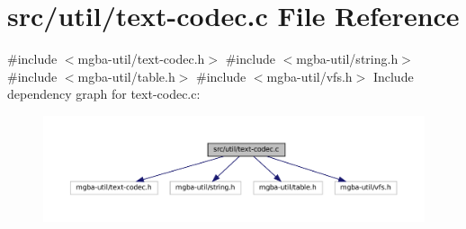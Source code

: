 \hypertarget{text-codec_8c}{}\section{src/util/text-\/codec.c File Reference}
\label{text-codec_8c}
{\ttfamily \#include $<$mgba-\/util/text-\/codec.\+h$>$}\newline
{\ttfamily \#include $<$mgba-\/util/string.\+h$>$}\newline
{\ttfamily \#include $<$mgba-\/util/table.\+h$>$}\newline
{\ttfamily \#include $<$mgba-\/util/vfs.\+h$>$}\newline
Include dependency graph for text-\/codec.c\+:
\nopagebreak
\begin{figure}[H]
\begin{center}
\leavevmode
\includegraphics[width=350pt]{text-codec_8c__incl}
\end{center}
\end{figure}
